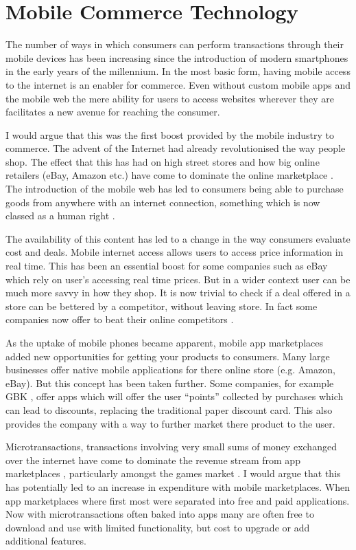 \documentclass[paper=a4, fontsize=12pt]{scrartcl}	%
\numberwithin{equation}{section}															%
\numberwithin{figure}{section}																%
\numberwithin{table}{section}
\begin{document}
\section{Mobile Commerce Technology}

The number of ways in which consumers can perform transactions through their mobile devices has been increasing since the introduction of modern smartphones in the early years of the millennium. In the most basic form, having mobile access to the internet is an enabler for commerce. Even without custom mobile apps and the mobile web the mere ability for users to access websites wherever they are facilitates a new avenue for reaching the consumer. 

I would argue that this was the first boost provided by the mobile industry to commerce. The advent of the Internet had already revolutionised the way people shop. The effect that this has had on high street stores and how big online retailers (eBay, Amazon etc.) have come to dominate the online marketplace \cite{}. The introduction of the mobile web has led to consumers being able to purchase goods from anywhere with an internet connection, something which is now classed as a human right \cite{}. 

The availability of this content has led to a change in the way consumers evaluate cost and deals. Mobile internet access allows users to access price information in real time. This has been an essential boost for some companies such as eBay which rely on user's accessing real time prices. But in a wider context user can be much more savvy in how they shop. It is now trivial to check if a deal offered in a store can be bettered by a competitor, without leaving store. In fact some companies now offer to beat their online competitors \cite{}.

As the uptake of mobile phones became apparent, mobile app marketplaces added new opportunities for getting your products to consumers. Many large businesses offer native mobile applications for there online store (e.g. Amazon, eBay). But this concept has been taken further. Some companies, for example GBK \cite{}, offer apps which will offer the user ``points'' collected by purchases which can lead to discounts, replacing the traditional paper discount card. This also provides the company with a way to further market there product to the user.

Microtransactions, transactions involving very small sums of money exchanged over the internet have come to dominate the revenue stream from app marketplaces \cite{venture2014report}, particularly amongst the games market \cite{mashable2015micro}. I would argue that this has potentially led to an increase in expenditure with mobile marketplaces. When app marketplaces where first most were separated into free and paid applications. Now with microtransactions often baked into apps many are often free to download and use with limited functionality, but cost to upgrade or add additional features.
\end{document}
